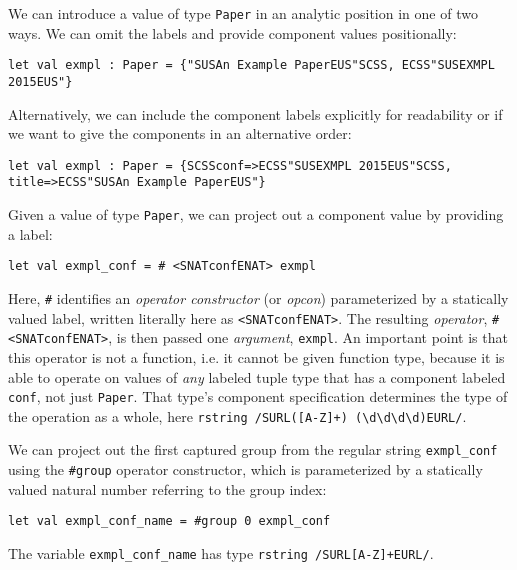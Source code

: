
We can introduce a value of type \lstinline{Paper} in an analytic position in one of two ways. We can omit the labels and provide component values positionally:
\begin{lstlisting}[numbers=none]
let val exmpl : Paper = {"SUSAn Example PaperEUS"SCSS, ECSS"SUSEXMPL 2015EUS"}
\end{lstlisting}
Alternatively, we can include the component labels explicitly for readability or if we want to give the components in an alternative order:
\begin{lstlisting}[numbers=none]
let val exmpl : Paper = {SCSSconf=>ECSS"SUSEXMPL 2015EUS"SCSS, title=>ECSS"SUSAn Example PaperEUS"}
\end{lstlisting}

Given a value of type \lstinline{Paper}, we can project out a component value by providing  a  label:%
\begin{lstlisting}[numbers=none]
let val exmpl_conf = # <SNATconfENAT> exmpl 
\end{lstlisting}
Here, \lstinline{#} identifies an \emph{operator constructor} (or \emph{opcon}) parameterized by a statically valued label, written literally here as \lstinline{<SNATconfENAT>}. The resulting \emph{operator}, \lstinline{# <SNATconfENAT>}, is then passed one \emph{argument}, \lstinline{exmpl}. An important point is that this operator is not a function, i.e. it cannot be given function type, because it is able to operate on values of \emph{any} labeled tuple type that has a component labeled \lstinline{conf}, not just \lstinline{Paper}. That type's component specification determines the type of the operation as a whole, here \lstinline{rstring /SURL([A-Z]+) (\d\d\d\d)EURL/}.

We can project out the first captured group from the regular string \lstinline{exmpl_conf} using the \lstinline{#group} operator constructor, which is parameterized by a statically valued natural number referring to the group index:
\begin{lstlisting}[numbers=none]
let val exmpl_conf_name = #group 0 exmpl_conf
\end{lstlisting}
The variable \lstinline{exmpl_conf_name} has type \lstinline{rstring /SURL[A-Z]+EURL/}.

